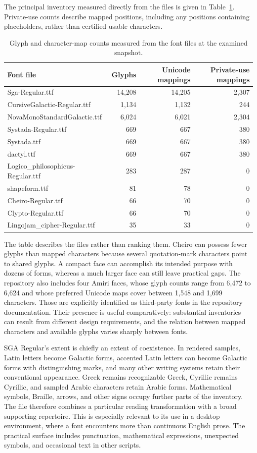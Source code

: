\documentclass[11pt]{article}
\begin{document}
The principal inventory measured directly from the files is given in Table~\ref{tab:inventory}. Private-use counts describe mapped positions, including any positions containing placeholders, rather than certified usable characters.

\begin{table}[ht]
\centering
\small
\begin{tabular}{@{}lrrr@{}}
\toprule
Font file & Glyphs & Unicode mappings & Private-use mappings\\
\midrule
Sga-Regular.ttf & 14,208 & 14,205 & 2,307\\
CursiveGalactic-Regular.ttf & 1,134 & 1,132 & 244\\
NovaMonoStandardGalactic.ttf & 6,024 & 6,021 & 2,304\\
Systada-Regular.ttf & 669 & 667 & 380\\
Systada.ttf & 669 & 667 & 380\\
dactyl.ttf & 669 & 667 & 380\\
Logico\_philosophicus-Regular.ttf & 283 & 287 & 0\\
shapeform.ttf & 81 & 78 & 0\\
Cheiro-Regular.ttf & 66 & 70 & 0\\
Clypto-Regular.ttf & 66 & 70 & 0\\
Lingojam\_cipher-Regular.ttf & 35 & 33 & 0\\
\bottomrule
\end{tabular}
\caption{Glyph and character-map counts measured from the font files at the examined snapshot.}
\label{tab:inventory}
\end{table}

The table describes the files rather than ranking them. Cheiro can possess fewer glyphs than mapped characters because several quotation-mark characters point to shared glyphs. A compact face can accomplish its intended purpose with dozens of forms, whereas a much larger face can still leave practical gaps. The repository also includes four Amiri faces, whose glyph counts range from 6,472 to 6,624 and whose preferred Unicode maps cover between 1,548 and 1,699 characters. Those are explicitly identified as third-party fonts in the repository documentation. Their presence is useful comparatively: substantial inventories can result from different design requirements, and the relation between mapped characters and available glyphs varies sharply between fonts.

SGA Regular's extent is chiefly an extent of coexistence. In rendered samples, Latin letters become Galactic forms, accented Latin letters can become Galactic forms with distinguishing marks, and many other writing systems retain their conventional appearance. Greek remains recognizable Greek, Cyrillic remains Cyrillic, and sampled Arabic characters retain Arabic forms. Mathematical symbols, Braille, arrows, and other signs occupy further parts of the inventory. The file therefore combines a particular reading transformation with a broad supporting repertoire. This is especially relevant to its use in a desktop environment, where a font encounters more than continuous English prose. The practical surface includes punctuation, mathematical expressions, unexpected symbols, and occasional text in other scripts.
\end{document}
